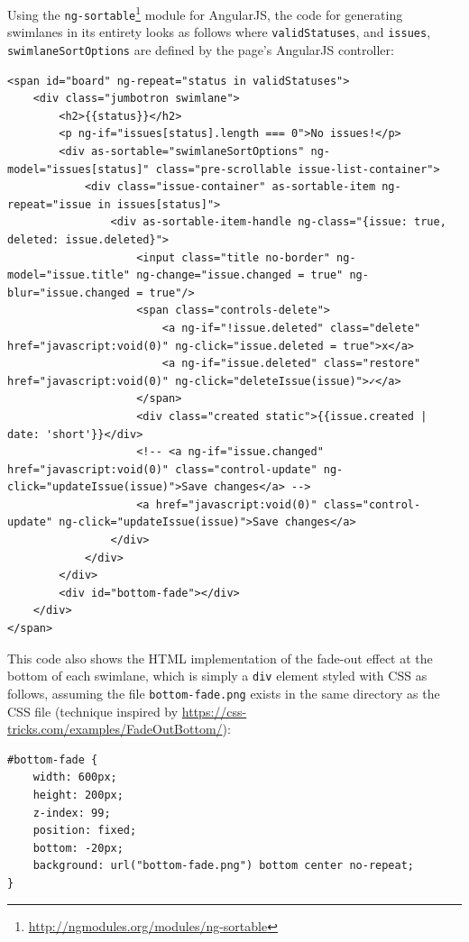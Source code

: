 Using the \texttt{ng-sortable}\footnote{\url{http://ngmodules.org/modules/ng-sortable}} module for AngularJS, the code for generating swimlanes in its entirety looks as follows where \texttt{validStatuses}, and \texttt{issues}, \texttt{swimlaneSortOptions} are defined by the page's AngularJS controller:

\begin{lstlisting}
<span id="board" ng-repeat="status in validStatuses">
    <div class="jumbotron swimlane">
        <h2>{{status}}</h2>
        <p ng-if="issues[status].length === 0">No issues!</p>
        <div as-sortable="swimlaneSortOptions" ng-model="issues[status]" class="pre-scrollable issue-list-container">
            <div class="issue-container" as-sortable-item ng-repeat="issue in issues[status]">
                <div as-sortable-item-handle ng-class="{issue: true, deleted: issue.deleted}">
                    <input class="title no-border" ng-model="issue.title" ng-change="issue.changed = true" ng-blur="issue.changed = true"/>
                    <span class="controls-delete">
                        <a ng-if="!issue.deleted" class="delete" href="javascript:void(0)" ng-click="issue.deleted = true">x</a>
                        <a ng-if="issue.deleted" class="restore" href="javascript:void(0)" ng-click="deleteIssue(issue)">✓</a>
                    </span>
                    <div class="created static">{{issue.created | date: 'short'}}</div>
                    <!-- <a ng-if="issue.changed" href="javascript:void(0)" class="control-update" ng-click="updateIssue(issue)">Save changes</a> -->
                    <a href="javascript:void(0)" class="control-update" ng-click="updateIssue(issue)">Save changes</a>
                </div>
            </div>
        </div>
        <div id="bottom-fade"></div>
    </div>
</span>
\end{lstlisting}

This code also shows the HTML implementation of the fade-out effect at the bottom of each swimlane, which is simply a \texttt{div} element styled with CSS as follows, assuming the file \texttt{bottom-fade.png} exists in the same directory as the CSS file (technique inspired by \url{https://css-tricks.com/examples/FadeOutBottom/}):

\begin{lstlisting}
#bottom-fade {
	width: 600px;
	height: 200px;
	z-index: 99;
	position: fixed;
	bottom: -20px;
	background: url("bottom-fade.png") bottom center no-repeat;
}
\end{lstlisting}


